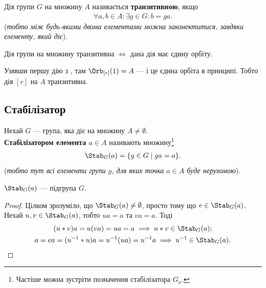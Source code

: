 \documentclass{math_library}
\begin{document}
\begin{definition}
Дія групи $G$ на множину $A$ називається \textbf{транзитивною}, якщо
\begin{align*}
\forall a,b \in A: \exists g \in G: b = ga.
\end{align*}
(\textit{тобто між будь-якими двома елементами можна законектитися, завдяки елементу, який діє}).
\end{definition}

\begin{remark}
Дія групи на множину транзитивна $\iff$ дана дія має єдину орбіту.
\end{remark}

\begin{example}
Узявши першу дію з , там $\Orb_{[r]}(1) = A$ --- і це єдина орбіта в принципі. Тобто дія $[r]$ на $A$ транзитивна.
\end{example}

\subsection{Стабілізатор}
\begin{definition}
Нехай $G$ --- група, яка діє на множину $A \neq \emptyset$.\\
\textbf{Стабілізатором елемента $a \in A$} називають множину\footnote{Частіше можна зустріти позначення стабілізатора $G_a$.}
\begin{align*}
\Stab_G(a) = \{g \in G \mid ga = a\}.
\end{align*}
(\textit{тобто тут всі елементи групи $g$, для яких точка $a \in A$ буде нерухомою}).
\end{definition}

\begin{proposition}
$\Stab_G(a)$ --- підгрупа $G$.
\end{proposition}

\begin{proof}
Цілком зрозуміло, що $\Stab_G(a) \neq \emptyset$, просто тому що $e \in \Stab_G(a)$.\\
Нехай $u,v \in \Stab_G(a)$, тобто $ua = a$ та $va = a$. Тоді
\begin{gather*}
(u*v)a = u(va) = ua = a \implies u*v \in \Stab_G(a); \\
a = ea = (u^{-1}*u)a = u^{-1}(ua) = u^{-1}a \implies u^{-1} \in \Stab_G(a). \qedhere
\end{gather*}
\end{proof}
\end{document}
